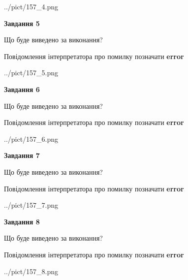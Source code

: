 \documentclass[12pt, ukrainian]{article}
\begin{document}
{\begin{center}
	{../pict/157_4.png}
\end{center}
\newpage

{\begin {center}\textbf{Завдання 5}\end {center}}\par
Що буде виведено за виконання? \par
Повідомлення інтерпретатора про помилку позначати \textbf{error}

\begin{center}
	{../pict/157_5.png}
\end{center}
\newpage

{\begin {center}\textbf{Завдання 6}\end {center}}\par
Що буде виведено за виконання? \par
Повідомлення інтерпретатора про помилку позначати \textbf{error}

\begin{center}
	{../pict/157_6.png}
\end{center}
\newpage

{\begin {center}\textbf{Завдання 7}\end {center}}\par
Що буде виведено за виконання? \par
Повідомлення інтерпретатора про помилку позначати \textbf{error}

\begin{center}
	{../pict/157_7.png}
\end{center}
\newpage

{\begin {center}\textbf{Завдання 8}\end {center}}\par
Що буде виведено за виконання? \par
Повідомлення інтерпретатора про помилку позначати \textbf{error}

\begin{center}
	{../pict/157_8.png}
\end{center}
\newpage

}
\end{document}
